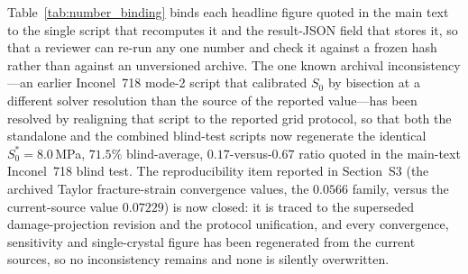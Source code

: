 \documentclass[11pt,a4paper,twocolumn]{article}
\begin{document}
Table~\ref{tab:number_binding} binds each headline figure quoted in the main text to the single script that
recomputes it and the result-JSON field that stores it, so that a reviewer can re-run any one number and
check it against a frozen hash rather than against an unversioned archive. The one known archival
inconsistency---an earlier Inconel~718 mode-2 script that calibrated $S_0$ by bisection at a different
solver resolution than the source of the reported value---has been resolved by realigning that script to
the reported grid protocol, so that both the standalone and the combined blind-test scripts now regenerate
the identical $S_0^* = 8.0$\,MPa, $71.5\%$ blind-average, $0.17$-versus-$0.67$ ratio quoted in the
main-text Inconel~718 blind test. The reproducibility item reported in
Section~S3 (the archived Taylor fracture-strain convergence values, the $0.0566$ family, versus the
current-source value $0.07229$) is now closed: it is traced to the superseded damage-projection revision and
the protocol unification, and every convergence, sensitivity and single-crystal figure has been regenerated
from the current sources, so no inconsistency remains and none is silently overwritten.
\end{document}
